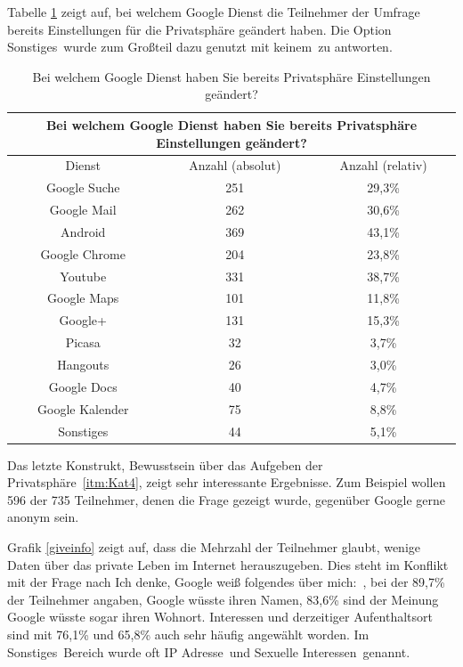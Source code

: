 Tabelle \ref{changedprivacy} zeigt auf, bei welchem Google Dienst die Teilnehmer der Umfrage bereits Einstellungen für die Privatsphäre geändert haben. Die Option \glqq Sonstiges\grqq\ wurde zum Großteil dazu genutzt mit \glqq keinem\grqq\ zu antworten.
\begin{table}
	\begin{tabular}[]{ c || c | c }
	\multicolumn{3}{c}{Bei welchem Google Dienst haben Sie bereits Privatsphäre Einstellungen geändert?}\\\hline
	Dienst & Anzahl (absolut) & Anzahl (relativ)\\\hline\hline
	Google Suche & 251 & 29,3\%\\
	Google Mail & 262 & 30,6\%\\
	Android & 369 & 43,1\%\\
	Google Chrome & 204 & 23,8\%\\
	Youtube & 331 & 38,7\%\\
	Google Maps & 101 & 11,8\%\\
	Google+ & 131 & 15,3\%\\
	Picasa & 32 & 3,7\%\\
	Hangouts & 26 & 3,0\%\\
	Google Docs & 40 & 4,7\%\\
	Google Kalender & 75 & 8,8\%\\
	Sonstiges & 44 & 5,1\%\\
	\end{tabular}
	\caption{Bei welchem Google Dienst haben Sie bereits Privatsphäre Einstellungen geändert?}\label{changedprivacy}
\end{table}

Das letzte Konstrukt, \glqq Bewusstsein über das Aufgeben der Privatsphäre\grqq\ \ref{itm:Kat4}, zeigt sehr interessante Ergebnisse. Zum Beispiel wollen 596 der 735 Teilnehmer, denen die Frage gezeigt wurde, gegenüber Google gerne anonym sein.

Grafik \ref{giveinfo} zeigt auf, dass die Mehrzahl der Teilnehmer glaubt, wenige Daten über das private Leben im Internet herauszugeben. Dies steht im Konflikt mit der Frage nach \glqq Ich denke, Google weiß folgendes über mich:\grqq\ , bei der 89,7\% der Teilnehmer angaben, Google wüsste ihren Namen, 83,6\% sind der Meinung Google wüsste sogar ihren Wohnort. Interessen und derzeitiger Aufenthaltsort sind mit 76,1\% und 65,8\% auch sehr häufig angewählt worden. Im \glqq Sonstiges\grqq\ Bereich wurde oft \glqq IP Adresse\grqq\ und \glqq Sexuelle Interessen\grqq\ genannt.

